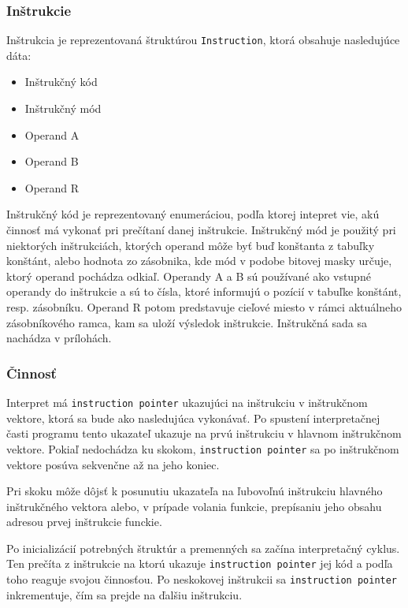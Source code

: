 \documentclass[12pt,a4paper,titlepage,final]{article}
\begin{document}
\subsubsection{Inštrukcie}
Inštrukcia je reprezentovaná štruktúrou \texttt{Instruction}, ktorá obsahuje nasledujúce dáta:
\begin{itemize}
    \itemsep0em
    \item Inštrukčný kód
    \item Inštrukčný mód
    \item Operand A
    \item Operand B
    \item Operand R
\end{itemize}
Inštrukčný kód je reprezentovaný enumeráciou, podľa ktorej intepret vie, akú činnosť má vykonať pri
prečítaní danej inštrukcie. Inštrukčný mód je použitý pri niektorých inštrukciách, ktorých operand
môže byť buď konštanta z tabuľky konštánt, alebo hodnota zo zásobnika, kde mód v podobe bitovej masky
určuje, ktorý operand pochádza odkiaľ. Operandy A a B sú používané ako vstupné operandy do inštrukcie a sú
to čísla, ktoré informujú o pozícií v tabuľke konštánt, resp. zásobníku. Operand R potom predstavuje cieľové miesto 
v rámci aktuálneho zásobníkového ramca, kam sa uloží výsledok inštrukcie. Inštrukčná sada sa nachádza v prílohách.

\subsubsection{Činnosť}
Interpret má \texttt{instruction pointer} ukazujúci na inštrukciu v inštrukčnom vektore,
ktorá sa bude ako nasledujúca vykonávať. Po spustení interpretačnej časti programu
tento ukazateľ ukazuje na prvú inštrukciu v hlavnom inštrukčnom vektore. Pokiaľ nedochádza ku skokom,
\texttt{instruction pointer} sa po inštrukčnom vektore posúva sekvenčne až na jeho koniec.

Pri skoku môže dôjsť k posunutiu ukazateľa na ľubovoľnú inštrukciu hlavného
inštrukčného vektora alebo, v prípade volania funkcie, prepísaniu jeho obsahu adresou prvej inštrukcie funckie.

Po inicializácií potrebných štruktúr a premenných sa začína interpretačný cyklus.
Ten prečíta z inštrukcie na ktorú ukazuje \texttt{instruction pointer} jej kód a podľa
toho reaguje svojou činnosťou. Po neskokovej inštrukcii sa \texttt{instruction pointer} inkrementuje,
čím sa prejde na ďalšiu inštrukciu.
\end{document}
